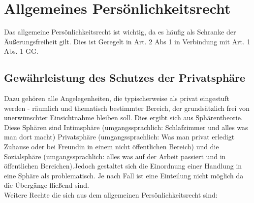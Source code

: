 \chapter{Allgemeines Persönlichkeitsrecht}
Das allgemeine Persönlichkeitsrecht ist wichtig, da es häufig als Schranke der Äußerungsfreiheit gilt. Dies ist Geregelt in Art. 2 Abs 1 in Verbindung mit Art. 1 Abs. 1 GG. \\
\section{Gewährleistung des Schutzes der Privatsphäre}
Dazu gehören alle Angelegenheiten, die typischerweise als privat eingestuft werden - räumlich und thematisch bestimmter Bereich, der grundsätzlich frei von unerwünschter Einsichtnahme bleiben soll. Dies ergibt sich aus Sphärentheorie. Diese Sphären sind Intimsphäre (umgangssprachlich: Schlafzimmer und alles was man dort macht) Privatsphäre (umgangssprachlich: Was man privat erledigt Zuhause oder bei Freundin in einem nicht öffentlichen Bereich) und die Sozialsphäre (umgangssprachlich: alles was auf der Arbeit passiert und in öffentlichen Bereichen).Jedoch gestaltet sich die Einordnung einer Handlung in eine Sphäre als problematisch. Je nach Fall ist eine Einteilung nicht möglich da die Übergänge fließend sind. \\
Weitere Rechte die sich aus dem allgemeinen Persönlichkeitsrecht sind:
